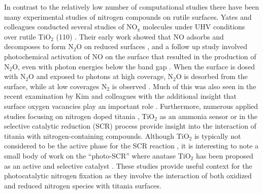 \documentclass[journal=ascecg,manuscript=article,articletitle=true]{achemso}
\begin{document}
In contrast to the relatively low number of computational studies there have been many experimental studies of nitrogen compounds on rutile surfaces. Yates and colleagues conducted several studies of NO$_{\mathrm{x}}$ molecules under UHV conditions over rutile TiO$_2$ (110) \cite{Lu1994,Rusu2000,Rusu2001}. Their early work showed that NO adsorbs and decomposes to form N$_2$O on reduced surfaces \cite{Lu1994}, and a follow up study involved photochemical activation of NO on the surface that resulted in the production of N$_2$O, even with photon energies below the band gap \cite{Rusu2000}. When the surface is dosed with N$_2$O and exposed to photons at high coverage, N$_2$O is desorbed from the surface, while at low coverages N$_2$ is observed \cite{Rusu2001}. Much of this was also seen in the recent examination by Kim and colleagues with the additional insight that surface oxygen vacancies play an important role \cite{Kim2016,Kim2014}. Furthermore, numerous applied studies focusing on nitrogen doped titania \cite{Chen_2007}, TiO$_2$ as an ammonia sensor \cite{Karunagaran_2007,Suganuma_2015} or in the selective catalytic reduction (SCR) process \cite{Busca_1998,Ramis_1990,Giraud_2014,Liu_2017} provide insight into the interaction of titania with nitrogen-containing compounds. Although TiO$_2$ is typically not considered to be the active phase for the SCR reaction \cite{Topsoe_1994}, it is interesting to note a small body of work on the ``photo-SCR'' where anatase TiO$_2$ has been proposed as an active and selective catalyst \cite{Teramura_2002,Teramura_2003,Teramura_2004,Yamazoe_2006,Yamazoe_2007,Yamamoto_2013,Lasek_2013,Ji_2014}. These studies provide useful context for the photocatalytic nitrogen fixation as they involve the interaction of both oxidized and reduced nitrogen species with titania surfaces.
\end{document}
